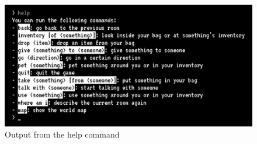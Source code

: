 \documentclass{article}
\begin{document}
    \begin{figure}
        \centering
        \includegraphics[width=\textwidth]{images/help-command.jpg}
        \caption{Output from the help command} \label{fig:help-command}
    \end{figure}
\end{document}

